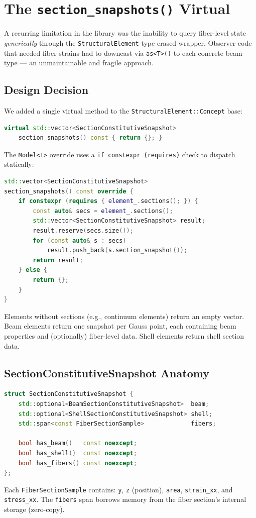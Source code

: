 \section{The \texttt{section\_snapshots()} Virtual}
\label{sec:seismic-section-snapshots}

A recurring limitation in the library was the inability to query
fiber-level state \emph{generically} through the
\texttt{StructuralElement} type-erased wrapper.  Observer code that
needed fiber strains had to downcast via \texttt{as<T>()} to each
concrete beam type --- an unmaintainable and fragile approach.

\subsection{Design Decision}

We added a single virtual method to the
\texttt{StructuralElement::Concept} base:
%
\begin{lstlisting}[language=C++,basicstyle=\ttfamily\small]
virtual std::vector<SectionConstitutiveSnapshot>
    section_snapshots() const { return {}; }
\end{lstlisting}
%
The \texttt{Model<T>} override uses a \texttt{if constexpr
(requires)} check to dispatch statically:
%
\begin{lstlisting}[language=C++,basicstyle=\ttfamily\small]
std::vector<SectionConstitutiveSnapshot>
section_snapshots() const override {
    if constexpr (requires { element_.sections(); }) {
        const auto& secs = element_.sections();
        std::vector<SectionConstitutiveSnapshot> result;
        result.reserve(secs.size());
        for (const auto& s : secs)
            result.push_back(s.section_snapshot());
        return result;
    } else {
        return {};
    }
}
\end{lstlisting}
%
Elements without sections (e.g., continuum elements) return an
empty vector.  Beam elements return one snapshot per Gauss point,
each containing beam properties and (optionally) fiber-level data.
Shell elements return shell section data.

\subsection{SectionConstitutiveSnapshot Anatomy}

\begin{lstlisting}[language=C++,basicstyle=\ttfamily\small]
struct SectionConstitutiveSnapshot {
    std::optional<BeamSectionConstitutiveSnapshot>  beam;
    std::optional<ShellSectionConstitutiveSnapshot> shell;
    std::span<const FiberSectionSample>             fibers;

    bool has_beam()   const noexcept;
    bool has_shell()  const noexcept;
    bool has_fibers() const noexcept;
};
\end{lstlisting}
%
Each \texttt{FiberSectionSample} contains:
\texttt{y}, \texttt{z} (position), \texttt{area},
\texttt{strain\_xx}, and \texttt{stress\_xx}.
The \texttt{fibers} span borrows memory from the fiber section's
internal storage (zero-copy).


